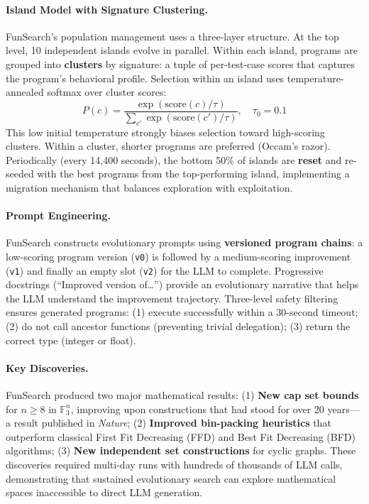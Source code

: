 \paragraph{Island Model with Signature Clustering.}
FunSearch's population management uses a three-layer structure. At the top level, 10 independent islands evolve in parallel. Within each island, programs are grouped into \textbf{clusters} by signature: a tuple of per-test-case scores that captures the program's behavioral profile. Selection within an island uses temperature-annealed softmax over cluster scores:
\begin{equation}
P(c) = \frac{\exp(\text{score}(c)/\tau)}{\sum_{c'}\exp(\text{score}(c')/\tau)}, \quad \tau_0 = 0.1
\end{equation}
This low initial temperature strongly biases selection toward high-scoring clusters. Within a cluster, shorter programs are preferred (Occam's razor). Periodically (every 14,400 seconds), the bottom 50\% of islands are \textbf{reset} and re-seeded with the best programs from the top-performing island, implementing a migration mechanism that balances exploration with exploitation.

\paragraph{Prompt Engineering.}
FunSearch constructs evolutionary prompts using \textbf{versioned program chains}: a low-scoring program version (\texttt{v0}) is followed by a medium-scoring improvement (\texttt{v1}) and finally an empty slot (\texttt{v2}) for the LLM to complete. Progressive docstrings (``Improved version of\ldots'') provide an evolutionary narrative that helps the LLM understand the improvement trajectory. Three-level safety filtering ensures generated programs: (1) execute successfully within a 30-second timeout; (2) do not call ancestor functions (preventing trivial delegation); (3) return the correct type (integer or float).

\paragraph{Key Discoveries.}
FunSearch produced two major mathematical results: (1) \textbf{New cap set bounds} for $n \geq 8$ in $\mathbb{F}_3^n$, improving upon constructions that had stood for over 20 years---a result published in \textit{Nature}; (2) \textbf{Improved bin-packing heuristics} that outperform classical First Fit Decreasing (FFD) and Best Fit Decreasing (BFD) algorithms; (3) \textbf{New independent set constructions} for cyclic graphs. These discoveries required multi-day runs with hundreds of thousands of LLM calls, demonstrating that sustained evolutionary search can explore mathematical spaces inaccessible to direct LLM generation.

